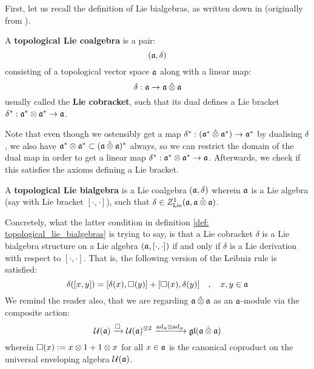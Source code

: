 First, let us recall the definition of Lie bialgebras, as written down in \cite[Section 1]{etingof_kazhdan_quantisation_1} (originally from \cite{drinfeld_quantum_groups}).
\begin{definition} \label{def: topological_lie_coalgebras}
    A \textbf{topological Lie coalgebra} is a pair:
        $$(\mathfrak{a}, \delta)$$
    consisting of a topological vector space $\mathfrak{a}$ along with a linear map:
        $$\delta: \a \to \a \hattensor \a$$
    usually called the \textbf{Lie cobracket}, such that its dual defines a Lie bracket $\delta^*: \a^* \tensor \a^* \to \a$.
\end{definition}
\begin{remark}
    Note that even though we ostensibly get a map $\delta^*: (\a^* \hattensor \a^*) \to \a^*$ by dualising $\delta$, we also have $\a^* \tensor \a^* \subset (\a \hattensor \a)^*$ always, so we can restrict the domain of the dual map in order to get a linear map $\delta^*: \a^* \tensor \a^* \to \a$. Afterwards, we check if this satisfies the axioms defining a Lie bracket.
\end{remark}
\begin{definition} \label{def: topological_lie_bialgebras}
    A \textbf{topological Lie bialgebra} is a Lie coalgebra $(\mathfrak{a}, \delta)$ wherein $\mathfrak{a}$ is a Lie algebra (say with Lie bracket $[\cdot, \cdot]$), such that $\delta \in Z^1_{\Lie}(\a, \a \hattensor \a)$.
\end{definition}
\begin{remark}
    Concretely, what the latter condition in definition \ref{def: topological_lie_bialgebras} is trying to say, is that a Lie cobracket $\delta$ is a Lie bialgebra structure on a Lie algebra $(\mathfrak{a}, [\cdot, \cdot])$ if and only if $\delta$ is a Lie derivation with respect to $[\cdot, \cdot]$. That is, the following version of the Leibniz rule is satisfied:
        \begin{equation} \label{equation: lie_bialgebra_cocycle_condition}
            \delta( [x, y] ) = [\delta(x), \Box(y)] + [\Box(x), \delta(y)] \quad, \quad x, y \in \mathfrak{a}
        \end{equation}
    We remind the reader also, that we are regarding $\a \hattensor \a$ as an $\mathfrak{a}$-module via the composite action:
        $$\calU(\a) \xrightarrow[]{\Box} \calU(\a)^{\tensor 2} \xrightarrow[]{\ad_{\a} \tensor \ad_{\a}} \gl(\a \hattensor \a)$$
    wherein $\Box(x) := x \tensor 1 + 1 \tensor x$ for all $x \in \mathfrak{a}$ is the canonical coproduct on the universal enveloping algebra $\mathcal{U}(\mathfrak{a})$.
\end{remark}

